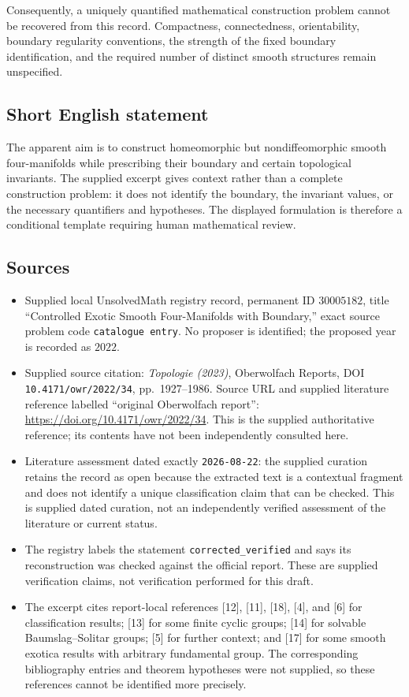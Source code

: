 \documentclass[11pt]{article}
\begin{document}
Consequently, a uniquely quantified mathematical construction problem cannot be recovered from this record. Compactness, connectedness, orientability, boundary regularity conventions, the strength of the fixed boundary identification, and the required number of distinct smooth structures remain unspecified.
\subsection{Short English statement}
The apparent aim is to construct homeomorphic but nondiffeomorphic smooth four-manifolds while prescribing their boundary and certain topological invariants. The supplied excerpt gives context rather than a complete construction problem: it does not identify the boundary, the invariant values, or the necessary quantifiers and hypotheses. The displayed formulation is therefore a conditional template requiring human mathematical review.
\subsection{Sources}
\begin{itemize}
\item Supplied local UnsolvedMath registry record, permanent ID \(30005182\), title ``Controlled Exotic Smooth Four-Manifolds with Boundary,'' exact source problem code \texttt{catalogue entry}. No proposer is identified; the proposed year is recorded as \(2022\).
\item Supplied source citation: \emph{Topologie (2023)}, Oberwolfach Reports, DOI \texttt{10.4171/owr/2022/34}, pp.\ 1927--1986. Source URL and supplied literature reference labelled ``original Oberwolfach report'': \url{https://doi.org/10.4171/owr/2022/34}. This is the supplied authoritative reference; its contents have not been independently consulted here.
\item Literature assessment dated exactly \texttt{2026-08-22}: the supplied curation retains the record as open because the extracted text is a contextual fragment and does not identify a unique classification claim that can be checked. This is supplied dated curation, not an independently verified assessment of the literature or current status.
\item The registry labels the statement \texttt{corrected\_verified} and says its reconstruction was checked against the official report. These are supplied verification claims, not verification performed for this draft.
\item The excerpt cites report-local references [12], [11], [18], [4], and [6] for classification results; [13] for some finite cyclic groups; [14] for solvable Baumslag--Solitar groups; [5] for further context; and [17] for some smooth exotica results with arbitrary fundamental group. The corresponding bibliography entries and theorem hypotheses were not supplied, so these references cannot be identified more precisely.
\end{itemize}
\end{document}
